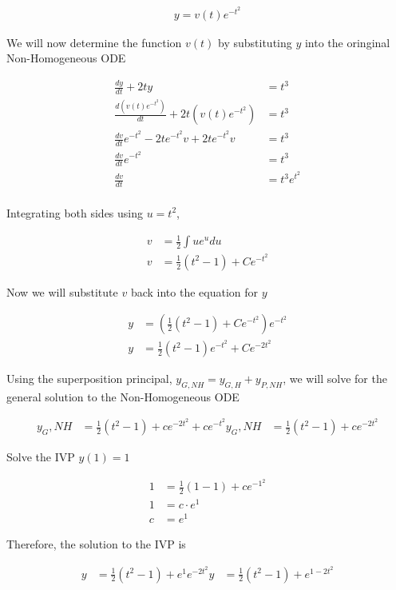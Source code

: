 \documentclass[12pt, letterpaper]{article}
\begin{document}
\begin{align*}
y = v(t)e^{-t^2}
\end{align*}

We will now determine the function $v(t)$ by substituting $y$ into the oringinal Non-Homogeneous ODE

\begin{align*}
\frac{dy}{dt} + 2ty &= t^3 \\
\frac{d(v(t)e^{-t^2})}{dt} + 2t(v(t)e^{-t^2}) &= t^3 \\
\frac{dv}{dt}e^{-t^2} - 2te^{-t^2}v + 2te^{-t^2}v &= t^3 \\
\frac{dv}{dt}e^{-t^2} &= t^3 \\
\frac{dv}{dt} &= t^3e^{t^2} \\
\end{align*}

Integrating both sides using $u = t^2$,

\begin{align*}
v &= \frac{1}{2}\int ue^{u}du \\
v &= \frac{1}{2}(t^2 - 1) + Ce^{-t^2}
\end{align*}

Now we will substitute $v$ back into the equation for $y$

\begin{align*}
y &= (\frac{1}{2}(t^2 - 1) + Ce^{-t^2})e^{-t^2} \\
y &= \frac{1}{2}(t^2 - 1)e^{-t^2} + Ce^{-2t^2}
\end{align*}

Using the superposition principal, $y_{G,NH} = y_{G,H} + y_{P,NH}$, we will solve for the general solution to the Non-Homogeneous ODE

\begin{align*}
   y_G,NH &= \frac{1}{2}(t^2 - 1) + ce^{-2t^2} + ce^{-t^2}
   y_G,NH &= \frac{1}{2}(t^2 - 1) + ce^{-2t^2}
\end{align*}

Solve the IVP $y(1) = 1$

\begin{align*}
    1 &= \frac{1}{2}(1 - 1) + ce^{-1^2} \\
    1 &= c \cdot e^{1} \\
    c &= e^1
\end{align*}

Therefore, the solution to the IVP is

\begin{align*}
    y &= \frac{1}{2}(t^2 - 1) + e^1e^{-2t^2}
    y &= \frac{1}{2}(t^2 - 1) + e^{1-2t^2}
\end{align*}
\end{document}
